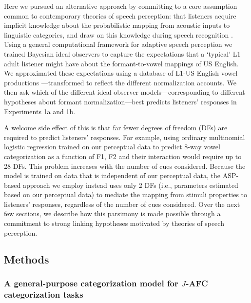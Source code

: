 \documentclass[preprint]{JASA}
\begin{document}
Here we pursued an alternative approach by committing to a core assumption common to contemporary theories of speech perception: that listeners acquire implicit knowledge about the probabilistic mapping from acoustic inputs to linguistic categories, and draw on this knowledge during speech recognition \citetext{\citealp[e.g., TRACE,][]{mcclelland-elman1986}; \citealp[exemplar theory,][]{johnson1997}; \citealp[Bayesian accounts,][]{luce-pisoni1998}; \citealp{nearey1990}; \citealp{norris-mcqueen2008}; \citealp[ASR-inspired models like DIANA or EARSHOT,][]{bosch2015}; \citealp{magnuson2020}}. Using a general computational framework for adaptive speech perception \citep[ASP,][]{xie2023} we trained Bayesian ideal observers to capture the expectations that a `typical' L1 adult listener might have about the formant-to-vowel mappings of US English. We approximated these expectations using a database of L1-US English vowel productions \citep{xie-jaeger2020}---transformed to reflect the different normalization accounts. We then ask which of the different ideal observer models---corresponding to different hypotheses about formant normalization---best predicts listeners' responses in Experiments 1a and 1b.

A welcome side effect of this is that far fewer degrees of freedom (DFs) are required to predict listeners' responses. For example, using ordinary multinomial logistic regression trained on our perceptual data to predict 8-way vowel categorization as a function of F1, F2 and their interaction would require up to 28 DFs. This problem increases with the number of cues considered. Because the model is trained on data that is independent of our perceptual data, the ASP-based approach we employ instead uses only 2 DFs (i.e., parameters estimated based on our perceptual data) to mediate the mapping from stimuli properties to listeners' responses, regardless of the number of cues considered. Over the next few sections, we describe how this parsimony is made possible through a commitment to strong linking hypotheses motivated by theories of speech perception.

\subsection{Methods}\label{methods}

\subsubsection{\texorpdfstring{A general-purpose categorization model for \(J\)-AFC categorization tasks}{A general-purpose categorization model for J-AFC categorization tasks}}\label{sec:predict-perception}
\end{document}
